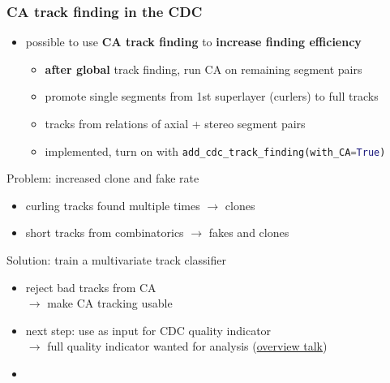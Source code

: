 \documentclass[18pt, aspectratio=169]{beamer}
\newcommand{\greenbold}[1]{\textcolor{kit-green100}{\bf{#1}}}
\newcommand{\orangebold}[1]{\textcolor{kit-orange100}{\bf{#1}}}
\begin{document}
\begin{frame}
  \frametitle{CA track finding in the CDC}
  \begin{itemize}
  \item possible to use \greenbold{CA track finding} to \orangebold{increase finding efficiency}
    \begin{itemize}
    \item \greenbold{after global} track finding, run CA on remaining segment pairs
    \item promote single segments from 1st superlayer (curlers) to full tracks
    \item tracks from relations of axial + stereo segment pairs
    \item implemented, turn on with \lstinline[language=python]{add_cdc_track_finding(with_CA=True)}            
    \end{itemize}
    
  \end{itemize}
  \pause
  \begin{alertblock}{Problem: increased clone and fake rate}
    \begin{itemize}
    \item curling tracks found multiple times $\rightarrow$ clones
    \item short tracks from combinatorics $\rightarrow$ fakes and clones
    \end{itemize}
  \end{alertblock}

  \begin{block}{Solution: train a multivariate track classifier}
    \begin{itemize}
    \item reject bad tracks from CA\\
      $\rightarrow$ make CA tracking usable
    \item next step: use as input for  CDC quality indicator\\
    $\rightarrow$ full quality indicator wanted for analysis
    (\href{https://kds.kek.jp/indico/event/26522/session/10/contribution/75/material/slides/0.pdf}{overview
      talk})
  \item 
  

    
\end{itemize}
  \end{block}
\end{frame}
\end{document}
